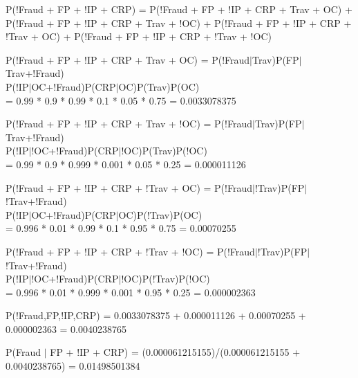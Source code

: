 \documentclass{article}
\begin{document}
	P(!Fraud + FP + !IP + CRP) = P(!Fraud + FP + !IP + CRP + Trav + OC) + P(!Fraud + FP + !IP + CRP + Trav + !OC) + P(!Fraud + FP + !IP + CRP + !Trav + OC) + P(!Fraud + FP + !IP + CRP + !Trav + !OC)
	
	P(!Fraud + FP + !IP + CRP + Trav + OC) = P(!Fraud$|$Trav)P(FP$|$Trav+!Fraud)\\P(!IP$|$OC+!Fraud)P(CRP$|$OC)P(Trav)P(OC)\\= 0.99 * 0.9 * 0.99 * 0.1 * 0.05 * 0.75 = 0.0033078375
	
	P(!Fraud + FP + !IP + CRP + Trav + !OC) = P(!Fraud$|$Trav)P(FP$|$Trav+!Fraud)\\P(!IP$|$!OC+!Fraud)P(CRP$|$!OC)P(Trav)P(!OC)\\ = 0.99 * 0.9 * 0.999 * 0.001 * 0.05 * 0.25 = 0.000011126
	
	P(!Fraud + FP + !IP + CRP + !Trav + OC) = P(!Fraud$|$!Trav)P(FP$|$!Trav+!Fraud)\\P(!IP$|$OC+!Fraud)P(CRP$|$OC)P(!Trav)P(OC)\\ = 0.996 * 0.01 * 0.99 * 0.1 * 0.95 * 0.75 = 0.00070255
	
	P(!Fraud + FP + !IP + CRP + !Trav + !OC) = P(!Fraud$|$!Trav)P(FP$|$!Trav+!Fraud)\\P(!IP$|$!OC+!Fraud)P(CRP$|$!OC)P(!Trav)P(!OC)\\ = 0.996 * 0.01 * 0.999 * 0.001 * 0.95 * 0.25 = 0.000002363
	
	P(!Fraud,FP,!IP,CRP) = 0.0033078375 + 0.000011126 + 0.00070255 + 0.000002363 = 0.0040238765
	
	P(Fraud $|$ FP + !IP + CRP) = (0.000061215155)/(0.000061215155 + 0.0040238765) = 0.01498501384
	
\end{document}
